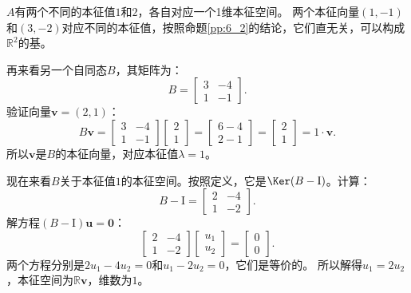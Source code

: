 \documentclass[12pt,UTF8]{ctexbook}
\begin{document}
$A$有两个不同的本征值$1$和$2$，各自对应一个1维本征空间。
两个本征向量$(1,-1)$和$(3,-2)$对应不同的本征值，按照命题\ref{pp:6_2}的结论，它们直无关，可以构成$\mathbb{R}^2$的基。

再来看另一个自同态$B$，其矩阵为：
$$
B = \begin{bmatrix} 3 & -4 \\ 1 & -1 \end{bmatrix}.
$$
验证向量$\mathbf{v}=(2,1)$：
$$
B\mathbf{v} =  \begin{bmatrix} 3 & -4 \\ 1 & -1 \end{bmatrix}\begin{bmatrix} 2 \\ 1 \end{bmatrix} = \begin{bmatrix} 6-4 \\ 2-1 \end{bmatrix} = \begin{bmatrix} 2 \\ 1 \end{bmatrix} = 1 \cdot \mathbf{v}.
$$
所以$\mathbf{v}$是$B$的本征向量，对应本征值$\lambda = 1$。

现在来看$B$关于本征值$1$的本征空间。按照定义，它是$\Ker(B - \mathrm{I})$。计算：
$$
B - \mathrm{I} = \begin{bmatrix} 2 & -4 \\ 1 & -2 \end{bmatrix}.
$$
解方程$(B - \mathrm{I})\mathbf{u} = \mathbf{0}$：
$$
\begin{bmatrix} 2 & -4 \\ 1 & -2 \end{bmatrix} \begin{bmatrix} u_1 \\ u_2 \end{bmatrix} = \begin{bmatrix} 0 \\ 0 \end{bmatrix}.
$$
两个方程分别是$2u_1 - 4u_2 = 0$和$u_1 - 2u_2 = 0$，它们是等价的。
所以解得$u_1 = 2u_2$，本征空间为$\mathbb{R}\mathbf{v}$，维数为$1$。
\end{document}
